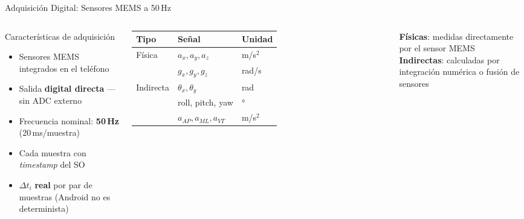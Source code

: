 \documentclass[10pt,aspectratio=169]{beamer}
\begin{document}
\begin{frame}{Adquisición Digital: Sensores MEMS a 50\,Hz}
  \begin{columns}[c]
      \begin{block}{Características de adquisición}
        \begin{itemize}
          \item Sensores MEMS integrados en el teléfono
          \item Salida \textbf{digital directa} — sin ADC externo
          \item Frecuencia nominal: \alert{\textbf{50\,Hz}} (20\,ms/muestra)
          \item Cada muestra con \textit{timestamp} del SO
          \item $\Delta t_i$ \textbf{real} por par de muestras (Android
                no es determinista)
        \end{itemize}
      \end{block}
      \centering
      \begin{tabular}{lll}
        \toprule
        \textbf{Tipo} & \textbf{Señal} & \textbf{Unidad}\\
        \midrule
        \multirow{2}{*}{\small Física}
          & $a_x, a_y, a_z$ & m/s$^2$\\
          & $g_x, g_y, g_z$ & rad/s\\[3pt]
        \multirow{3}{*}{\small Indirecta}
          & $\theta_x, \theta_y$ & rad\\
          & roll, pitch, yaw & °\\
          & $a_{AP}, a_{ML}, a_{VT}$ & m/s$^2$\\
        \bottomrule
      \end{tabular}
      \vspace{0.5em}

      {\small \textbf{Físicas}: medidas directamente por el sensor MEMS\\[0.2em]
      \textbf{Indirectas}: calculadas por integración numérica o
      fusión de sensores}
  \end{columns}
\end{frame}
\end{document}
